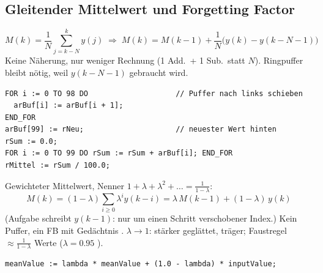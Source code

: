 \subsection{Gleitender Mittelwert und Forgetting Factor}
\label{sec:mittelwert}
\begin{formel}
\[M(k)=\frac1N\sum_{j=k-N}^{k}y(j)
\;\Rightarrow\; M(k)=M(k-1)+\frac1N\big(y(k)-y(k-N-1)\big)\]
Keine Näherung, nur weniger Rechnung (1 Add.\ + 1 Sub.\ statt $N$).
Ringpuffer bleibt nötig, weil $y(k-N-1)$ gebraucht wird.
\end{formel}
\begin{lstlisting}
FOR i := 0 TO 98 DO                    // Puffer nach links schieben
  arBuf[i] := arBuf[i + 1];
END_FOR
arBuf[99] := rNeu;                     // neuester Wert hinten
rSum := 0.0;
FOR i := 0 TO 99 DO rSum := rSum + arBuf[i]; END_FOR
rMittel := rSum / 100.0;
\end{lstlisting}
\begin{formel}
Gewichteter Mittelwert, Nenner $1+\lambda+\lambda^2+\dots=\frac{1}{1-\lambda}$:
\[M(k)=(1-\lambda)\sum_{i\ge0}\lambda^i y(k-i)
=\lambda\,M(k-1)+(1-\lambda)\,y(k)\]
(Aufgabe schreibt $y(k-1)$: nur um einen Schritt verschobener Index.)
Kein Puffer, ein FB mit Gedächtnis . $\lambda\to1$: stärker
geglättet, träger; Faustregel $\approx\frac{1}{1-\lambda}$ Werte
($\lambda=0.95$ ).
\end{formel}
\begin{lstlisting}
meanValue := lambda * meanValue + (1.0 - lambda) * inputValue;
\end{lstlisting}

